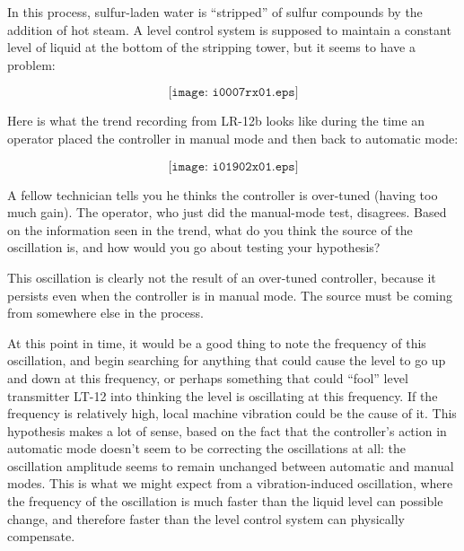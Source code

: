 

In this process, sulfur-laden water is ``stripped'' of sulfur compounds by the addition of hot steam.  A level control system is supposed to maintain a constant level of liquid at the bottom of the stripping tower, but it seems to have a problem:

$$\texttt{[image: i0007rx01.eps]}$$

\filbreak

Here is what the trend recording from LR-12b looks like during the time an operator placed the controller in manual mode and then back to automatic mode:

$$\texttt{[image: i01902x01.eps]}$$

A fellow technician tells you he thinks the controller is over-tuned (having too much gain).  The operator, who just did the manual-mode test, disagrees.  Based on the information seen in the trend, what do you think the source of the oscillation is, and how would you go about testing your hypothesis?







This oscillation is clearly not the result of an over-tuned controller, because it persists even when the controller is in manual mode.  The source must be coming from somewhere else in the process.

\vskip 10pt

At this point in time, it would be a good thing to note the frequency of this oscillation, and begin searching for anything that could cause the level to go up and down at this frequency, or perhaps something that could ``fool'' level transmitter LT-12 into thinking the level is oscillating at this frequency.  If the frequency is relatively high, local machine vibration could be the cause of it.  This hypothesis makes a lot of sense, based on the fact that the controller's action in automatic mode doesn't seem to be correcting the oscillations at all: the oscillation amplitude seems to remain unchanged between automatic and manual modes.  This is what we might expect from a vibration-induced oscillation, where the frequency of the oscillation is much faster than the liquid level can possible change, and therefore faster than the level control system can physically compensate.

